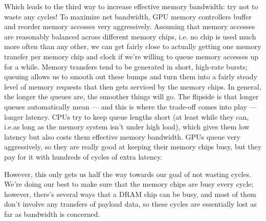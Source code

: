 Which leads to the third way to increase effective memory bandwidth: try not to waste any cycles! To
maximize net bandwidth, GPU memory controllers buffer and reorder memory accesses very aggressively.
Assuming that memory accesses are reasonably balanced across different memory chips, i.e. no chip is used
much more often than any other, we can get fairly close to actually getting one memory transfer per memory
chip and clock if we're willing to queue memory accesses up for a while. Memory transfers tend to be generated
in short, high-rate bursts; queuing allows us to smooth out these bumps and turn them into a fairly steady
level of memory requests that then gets serviced by the memory chips. In general, the longer the queues are,
the smoother things will go. The flipside is that longer queues automatically mean --- and this is where the
trade-off comes into play --- longer latency. CPUs try to keep queue lengths short (at least while they can,
i.e.\@ as long as the memory system isn't under high load), which gives them low latency but also costs them
effective memory bandwidth. GPUs queue very aggressively, so they are really good at keeping their memory chips
busy, but they pay for it with hundreds of cycles of extra latency.

However, this only gets us half the way towards our goal of not wasting cycles. We're doing our best to make
sure that the memory chips are busy every cycle; however, there's several ways that a DRAM chip can be busy,
and most of them don't involve any transfers of payload data, so these cycles are essentially lost as far as
bandwidth is concerned.

{}
